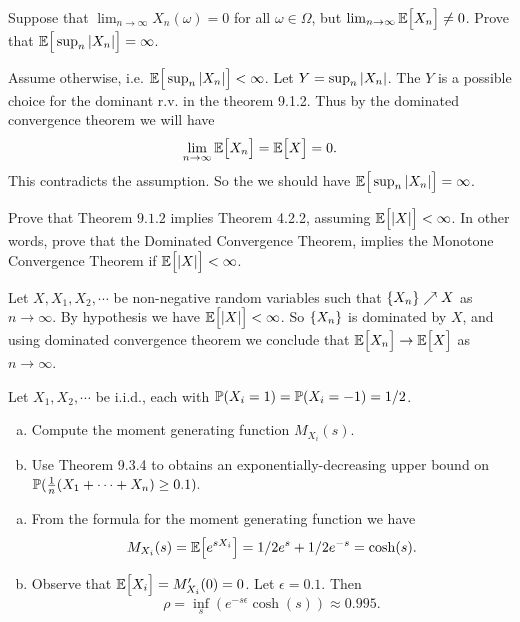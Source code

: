 \begin{problem}
	Suppose that $ \lim_{n\to\infty} X_n(\omega) = 0 $ for all $ \omega\in \Omega $, but $ \lim_{n\to\infty}\mathbb{E}\big[X_n\big]\neq 0 $. Prove that $ \mathbb{E}\big[\sup_n |X_n|\big] = \infty $.
\end{problem}
\begin{solution}
	Assume otherwise, i.e. $ \mathbb{E}\big[\sup_n|X_n|\big] < \infty $. Let $ Y = \sup_n|X_n| $. The $ Y $ is a possible choice for the dominant r.v. in the theorem 9.1.2. Thus by the dominated convergence theorem we will have
	\[ \lim_{n\to\infty}\mathbb{E}\big[X_n\big] = \mathbb{E}\big[X\big] = 0. \]
	This contradicts the assumption. So the we should have $ \mathbb{E}\big[\sup_n|X_n|\big]=\infty $.
\end{solution}


\begin{problem}
	Prove that Theorem $ 9.1.2 $ implies Theorem 4.2.2, assuming $ \mathbb{E}\big[|X|\big]<\infty $. In other words, prove that the Dominated Convergence Theorem, implies the Monotone Convergence Theorem if $ \mathbb{E}\big[|X|\big]<\infty $.
\end{problem}
\begin{solution}
	Let $ X,X_1,X_2,\cdots $ be non-negative random variables such that $ \{X_n\}\nearrow X $ as $ n\to\infty $. By hypothesis we have $ \mathbb{E}\big[|X|\big] < \infty $. So $ \{X_n\} $ is dominated by $ X $, and using dominated convergence theorem we conclude that $ \mathbb{E}\big[X_n\big]\to\mathbb{E}\big[X\big] $ as $ n\to\infty $.
\end{solution}

\begin{problem}
	Let $ X_1,X_2,\cdots $ be i.i.d., each with $ \mathbb{P}(X_i=1)=\mathbb{P}(X_i=-1)=1/2 $. 
	\begin{enumerate}[(a)]
		\item Compute the moment generating function $ M_{X_i}(s) $.
		\item Use Theorem 9.3.4 to obtains an exponentially-decreasing upper bound on $ \mathbb{P}(\frac{1}{n}(X_1+\cdots+X_n)\geq 0.1). $ 
	\end{enumerate}
\end{problem}
\begin{solution}
	\begin{enumerate}[(a)]
		\item From the formula for the moment generating function we have
		\[ M_{X_i}(s) = \mathbb{E}\big[e^{sX_i}\big] = 1/2e^s + 1/2 e^{-s} = \cosh(s). \]
		
		\item Observe that $ \mathbb{E}\big[X_i\big] = M'_{X_i}(0) = 0 $. Let $ \epsilon=0.1 $. Then 
		\[ \rho = \inf_s (e^{-s\epsilon}\cosh(s)) \approx 0.995. \]
	\end{enumerate}
\end{solution}


